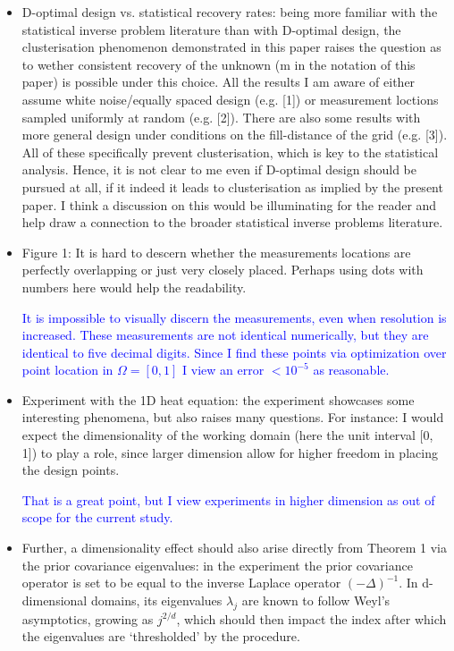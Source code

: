 \documentclass{amsart}
\newcommand{\answer}[1]{\vskip 0.05in \textcolor{blue}{#1} \vskip 0.05in}
\begin{document}
\begin{itemize}
\item D-optimal design vs. statistical recovery rates: being more
  familiar with the statistical inverse problem literature than with
  D-optimal design, the clusterisation phenomenon demonstrated in this
  paper raises the question as to wether consistent recovery of the
  unknown (m in the notation of this paper) is possible under this
  choice. All the results I am aware of either assume white
  noise/equally spaced design (e.g. [1]) or measurement loctions
  sampled uniformly at random (e.g. [2]). There are also some
  results with more general design under conditions on the
  fill-distance of the grid (e.g. [3]). All of these specifically
  prevent clusterisation, which is key to the statistical
  analysis. Hence, it is not clear to me even if D-optimal design
  should be pursued at all, if it indeed it leads to clusterisation as
  implied by the present paper. I think a discussion on this would be
  illuminating for the reader and help draw a connection to the
  broader statistical inverse problems literature.

\item Figure 1: It is hard to descern whether the measurements
  locations are perfectly overlapping or just very closely
  placed. Perhaps using dots with numbers here would help the
  readability.
  
  \answer{It is impossible to visually discern the measurements, even
  when resolution is increased. These measurements are not identical
  numerically, but they are identical to five decimal digits. Since I
  find these points via optimization over point location in
  $\Omega=[0,1]$ I view an error $<10^{-5}$ as reasonable.}

\item Experiment with the 1D heat equation: the experiment showcases
  some interesting phenomena, but also raises many questions. For
  instance: I would expect the dimensionality of the working domain
  (here the unit interval [0, 1]) to play a role, since larger
  dimension allow for higher freedom in placing the design points.

  \answer{That is a great point, but I view experiments in higher
    dimension as out of scope for the current study.}

\item Further, a dimensionality effect should also arise directly from
  Theorem 1 via the prior covariance eigenvalues: in the experiment
  the prior covariance operator is set to be equal to the inverse
  Laplace operator $(-\Delta)^{-1}$. In d-dimensional domains, its
  eigenvalues $\lambda_j$ are known to follow Weyl’s asymptotics,
  growing as $j^{2/d}$, which should then impact the index after which
  the eigenvalues are ‘thresholded’ by the procedure.


\end{itemize}
\end{document}
